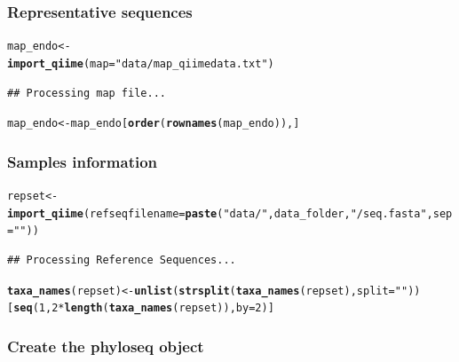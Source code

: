 \documentclass[12pt]{article}\usepackage[]{graphicx}\usepackage[]{color}
\makeatletter
\newcommand{\hlnum}[1]{\textcolor[rgb]{0.686,0.059,0.569}{#1}}%
\newcommand{\hlstr}[1]{\textcolor[rgb]{0.192,0.494,0.8}{#1}}%
\newcommand{\hlopt}[1]{\textcolor[rgb]{0,0,0}{#1}}%
\newcommand{\hlstd}[1]{\textcolor[rgb]{0.345,0.345,0.345}{#1}}%
\newcommand{\hlkwb}[1]{\textcolor[rgb]{0.69,0.353,0.396}{#1}}%
\newcommand{\hlkwc}[1]{\textcolor[rgb]{0.333,0.667,0.333}{#1}}%
\newcommand{\hlkwd}[1]{\textcolor[rgb]{0.737,0.353,0.396}{\textbf{#1}}}%
\newenvironment{kframe}{%
 \def\at@end@of@kframe{}%
 \ifinner\ifhmode%
  \def\at@end@of@kframe{\end{minipage}}%
  \begin{minipage}{\columnwidth}%
 \fi\fi%
 \def\FrameCommand##1{\hskip\@totalleftmargin \hskip-\fboxsep
 \colorbox{shadecolor}{##1}\hskip-\fboxsep
     \hskip-\linewidth \hskip-\@totalleftmargin \hskip\columnwidth}%
 \MakeFramed {\advance\hsize-\width
   \@totalleftmargin\z@ \linewidth\hsize
   \@setminipage}}%
 {\par\unskip\endMakeFramed%
 \at@end@of@kframe}
\newenvironment{knitrout}{}{} %
\numberwithin{figure}{section}
\makeatother
\begin{document}
 \subsubsection{Representative sequences}
\begin{knitrout}\small
{}\color{fgcolor}\begin{kframe}
\begin{alltt}
\hlstd{map_endo} \hlkwb{<-}
  \hlkwd{import_qiime}\hlstd{(}\hlkwc{map} \hlstd{=} \hlstr{"data/map_qiimedata.txt"}\hlstd{)}
\end{alltt}
\begin{verbatim}
## Processing map file...
\end{verbatim}
\begin{alltt}
\hlstd{map_endo} \hlkwb{<-} \hlstd{map_endo[}\hlkwd{order}\hlstd{(}\hlkwd{rownames}\hlstd{(map_endo)),]}
\end{alltt}
\end{kframe}
\end{knitrout}

 \subsubsection{Samples information}
\begin{knitrout}\small
{}\color{fgcolor}\begin{kframe}
\begin{alltt}
\hlstd{repset} \hlkwb{<-} \hlkwd{import_qiime}\hlstd{(}\hlkwc{refseqfilename} \hlstd{=} \hlkwd{paste}\hlstd{(}\hlstr{"data/"}\hlstd{, data_folder,} \hlstr{"/seq.fasta"}\hlstd{,} \hlkwc{sep}\hlstd{=}\hlstr{""}\hlstd{))}
\end{alltt}
\begin{verbatim}
## Processing Reference Sequences...
\end{verbatim}
\begin{alltt}
\hlkwd{taxa_names}\hlstd{(repset)} \hlkwb{<-} \hlkwd{unlist}\hlstd{(}\hlkwd{strsplit}\hlstd{(}\hlkwd{taxa_names}\hlstd{(repset),} \hlkwc{split} \hlstd{=} \hlstr{" "}\hlstd{))[}\hlkwd{seq}\hlstd{(}\hlnum{1}\hlstd{,} \hlnum{2}\hlopt{*}\hlkwd{length}\hlstd{(}\hlkwd{taxa_names}\hlstd{(repset)),} \hlkwc{by} \hlstd{=} \hlnum{2}\hlstd{)]}
\end{alltt}
\end{kframe}
\end{knitrout}

 \subsubsection{Create the phyloseq object}
\end{document}
